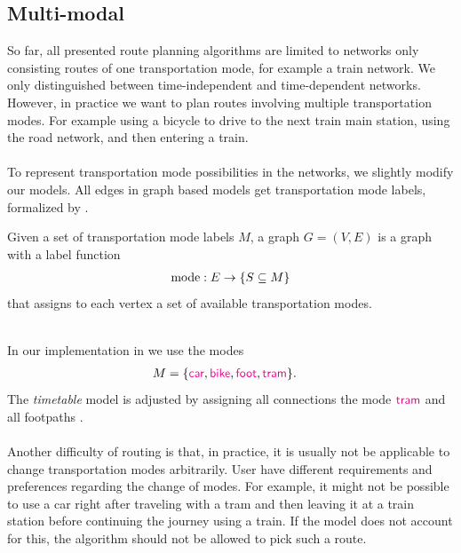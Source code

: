 \subsection{Multi-modal}
	So far, all presented route planning algorithms are limited to networks only consisting routes of one transportation mode,
	for example a train network. We only distinguished between time-independent and time-dependent networks. However, in practice
	we want to plan routes involving multiple transportation modes. For example using a bicycle to drive to the next train main station,
	using the road network, and then entering a train.\\\\
	To represent transportation mode possibilities in the networks, we slightly modify our models. All edges in graph based models
	get transportation mode labels, formalized by .
	\begin{mydef}\label{multiModalGraph}
		Given a set of transportation mode labels $M$, a \textnormal{\multiModal graph} $G = (V, E)$ is
		a graph with a label function
		\begin{align*}
			\operatorname{mode}: E \to \{S \subseteq M\}
		\end{align*}
		that assigns to each vertex a set of available transportation modes.
	\end{mydef}\quad\\
	In our implementation in \cobweb we use the modes
	\begin{align*}
		M	&= \{\textcolor{magenta}{\textsf{car}}, \textcolor{magenta}{\textsf{bike}}, \textcolor{magenta}{\textsf{foot}}, \textcolor{magenta}{\textsf{tram}}\}.
	\end{align*}
	The \textit{timetable} model is adjusted by assigning all connections the mode $\textcolor{magenta}{\textsf{tram}}$ and
	all footpaths \foot.\\\\
	Another difficulty of \multiModal routing is that, in practice, it is usually not be applicable to change transportation modes arbitrarily.
	User have different requirements and preferences regarding the change of modes. For example, it might not be possible to
	use a car right after traveling with a tram and then leaving it at a train station before continuing the journey using a train.
	If the model does not account for this, the algorithm should not be allowed to pick such a route.\\
